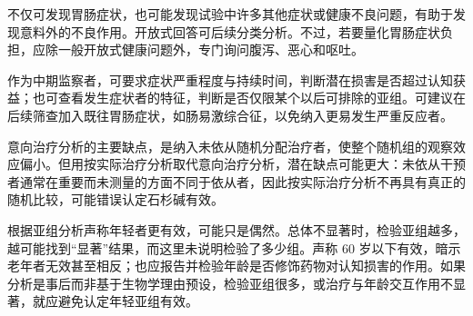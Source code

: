 \begin{answerlist}
\item[4d.] 不仅可发现胃肠症状，也可能发现试验中许多其他症状或健康不良问题，有助于发现意料外的不良作用。开放式回答可后续分类分析。不过，若要量化胃肠症状负担，应除一般开放式健康问题外，专门询问腹泻、恶心和呕吐。
\item[5.] 作为中期监察者，可要求症状严重程度与持续时间，判断潜在损害是否超过认知获益；也可查看发生症状者的特征，判断是否仅限某个以后可排除的亚组。可建议在后续筛查加入既往胃肠症状，如肠易激综合征，以免纳入更易发生严重反应者。
\item[6.] 意向治疗分析的主要缺点，是纳入未依从随机分配治疗者，使整个随机组的观察效应偏小。但用按实际治疗分析取代意向治疗分析，潜在缺点可能更大：未依从干预者通常在重要而未测量的方面不同于依从者，因此按实际治疗分析不再具有真正的随机比较，可能错误认定石杉碱有效。
\item[7.] 根据亚组分析声称年轻者更有效，可能只是偶然。总体不显著时，检验亚组越多，越可能找到“显著”结果，而这里未说明检验了多少组。声称 60 岁以下有效，暗示老年者无效甚至相反；也应报告并检验年龄是否修饰药物对认知损害的作用。如果分析是事后而非基于生物学理由预设，检验亚组很多，或治疗与年龄交互作用不显著，就应避免认定年轻亚组有效。
\end{answerlist}


